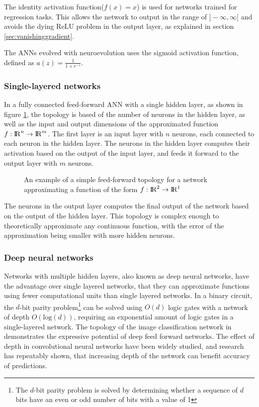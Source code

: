 The identity activation function($f(x) = x$) is used for networks trained for regression tasks. This allows the network to output in the range of $]-\infty,\infty[$ and avoids the dying ReLU problem in the output layer, as explained in section \ref{sec:vanishinggradient}.

The ANNs evolved with neuroevolution uses the sigmoid activation function, defined as $a(z) = \frac{1}{1+e^{-z}}$.


\subsubsection{Single-layered networks}
In a fully connected feed-forward ANN with a single hidden layer, as shown in figure \ref{fig:fft}, the topology is based of the number of neurons in the hidden layer, as well as the input and output dimensions of the approximated function $f:{\rm I\!R}^n \rightarrow {\rm I\!R}^m$. The first layer is an input layer with $n$ neurons, each connected to each neuron in the hidden layer. The neurons in the hidden layer computes their activation based on the output of the input layer, and feeds it forward to the output layer with $m$ neurons.

\begin{figure}[H]
    \centering
    \vspace{-0.8cm}
    
    \caption[Simple feed-forward topology]{An example of a simple feed-forward topology for a network approximating a function of the form $f:{\rm I\!R}^2 \rightarrow {\rm I\!R}^1$}
    \label{fig:fft}
\end{figure}

The neurons in the output layer computes the final output of the network based on the output of the hidden layer. This topology is complex enough to theoretically approximate any continuous function, with the error of the approximation being smaller with more hidden neurons.

\subsubsection{Deep neural networks}
Networks with multiple hidden layers, also known as deep neural networks, have the advantage over single layered networks, that they can approximate functions using fewer computational units than single layered networks\cite{yoshua}. In a binary circuit, the $d$-bit parity problem\footnote{The $d$-bit parity problem is solved by determining whether a sequence of $d$ bits have an even or odd number of bits with a value of 1} can be solved using $O(d)$ logic gates with a network of depth $O(\text{log}(d))$, requiring an exponential amount of logic gates\cite{Yao} in a single-layered network. The topology of the image classification network in \cite{christian} demonstrates the expressive potential of deep feed forward networks. The effect of depth in convolutional neural networks have been widely studied, and research has repeatably shown, that increasing depth of the network can benefit accuracy of predictions\cite{karen}.

